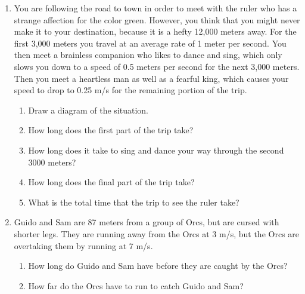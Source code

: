 \documentclass[letterpaper, 12pt]{article}
\begin{document}
\begin{enumerate}
\vspace{2.95in}
\item You are following the road to town in order to meet with the ruler who has a strange affection for the color green.  However, you think that you might never make it to your destination, because it is a hefty 12,000 meters away.  For the first 3,000 meters you travel at an average rate of 1 meter per second.  You then meet a brainless companion who likes to dance and sing, which only  slows you down to a speed of 0.5 meters per second for the next 3,000 meters.  Then you meet a heartless man as well as a fearful king, which causes your speed to drop to 0.25 m/s for the remaining portion of the trip.  
\begin{enumerate} \item Draw a diagram of the situation.
	\vspace{0.65in}
	\item How long does the first part of the trip take?
	\vspace{0.65in}
	\item How long does it take to sing and dance your way through the second 3000 meters? 
	\vspace{0.65in}
	\item How long does the final part of the trip take?
	\vspace{0.65in}
	\item What is the total time that the trip to see the ruler take?
\end{enumerate}
\vspace{0.65in}
\item Guido and Sam are 87 meters from a group of Orcs, but are cursed with shorter legs. They are running away from the Orcs at 3 m/s, but the Orcs are overtaking them by running at 7 m/s.  
\begin{enumerate}
\item How long do Guido and Sam have before they are caught by the Orcs?
\vspace{0.65in}
\item How far do the Orcs have to run to catch Guido and Sam?
\end{enumerate}

	
\end{enumerate}
 
\end{document}
